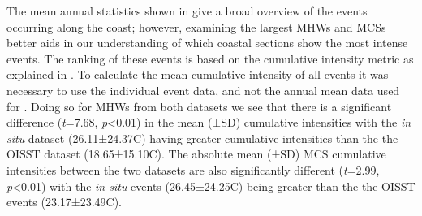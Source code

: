 \documentclass[a4paper,10pt,review]{elsarticle}
\begin{document}
The mean annual statistics shown in  give a broad overview of the events occurring along the coast; however, examining the largest MHWs and MCSs better aids in our understanding of which coastal sections show the most intense events. The ranking of these events is based on the cumulative intensity metric as explained in . To calculate the mean cumulative intensity of all events it was necessary to use the individual event data, and not the annual mean data used for . Doing so for MHWs from both datasets we see that there is a significant difference (\emph{t}=7.68, \emph{p}<0.01) in the mean (±SD) cumulative intensities with the \emph{in situ} dataset (26.11±24.37\degree C) having greater cumulative intensities than the the OISST dataset (18.65±15.10\degree C). The absolute mean (±SD) MCS cumulative intensities between the two datasets are also significantly different (\emph{t}=2.99, \emph{p}<0.01) with the \emph{in situ} events (26.45±24.25\degree C) being greater than the the OISST events (23.17±23.49\degree C).
\end{document}
